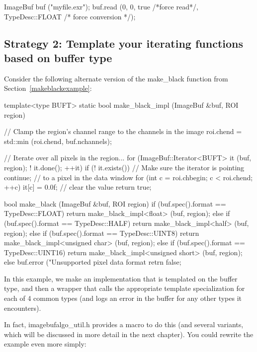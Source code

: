 \begin{code}
    ImageBuf buf ("myfile.exr");
    buf.read (0, 0, true /*force read*/,
              TypeDesc::FLOAT /* force conversion */);
\end{code}

\subsection*{Strategy 2: Template your iterating functions based on
buffer type}

Consider the following alternate version of the {\cf make_black} function
from Section~\ref{makeblackexample}:

\begin{code}
template<type BUFT>
static bool make_black_impl (ImageBuf &buf, ROI region)
{
    // Clamp the region's channel range to the channels in the image
    roi.chend = std::min (roi.chend, buf.nchannels);

    // Iterate over all pixels in the region...
    for (ImageBuf::Iterator<BUFT> it (buf, region);  ! it.done();  ++it) {
        if (! it.exists())   // Make sure the iterator is pointing
            continue;        //   to a pixel in the data window
        for (int c = roi.chbegin;  c < roi.chend;  ++c)
            it[c] = 0.0f;  // clear the value
    }
    return true;
}

bool make_black (ImageBuf &buf, ROI region)
{
    if (buf.spec().format == TypeDesc::FLOAT)
        return make_black_impl<float> (buf, region);
    else if (buf.spec().format == TypeDesc::HALF)
        return make_black_impl<half> (buf, region);
    else if (buf.spec().format == TypeDesc::UINT8)
        return make_black_impl<unsigned char> (buf, region);
    else if (buf.spec().format == TypeDesc::UINT16)
        return make_black_impl<unsigned short> (buf, region);
    else {
        buf.error ("Unsupported pixel data format %
        retrn false;
    }
}
\end{code}

In this example, we make an implementation that is templated on
the buffer type, and then a wrapper that calls the appropriate
template specialization for each of 4 common types (and logs
an error in the buffer for any other types it encounters).

In fact, {\cf imagebufalgo_util.h} provides a macro to do this (and
several variants, which will be discussed in more detail in the next
chapter).  You could rewrite the example even more simply:

